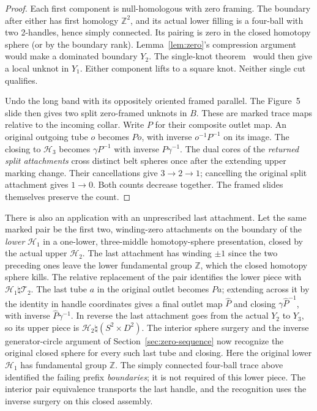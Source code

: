 \documentclass[11pt,letterpaper]{article}
\numberwithin{equation}{section}
\theoremstyle{remark}
\newcommand{\HB}[1]{\mathcal H_{#1}}
\newcommand{\TB}[1]{\mathcal T_{#1}}
\begin{document}
\begin{proof}
Each first component is null-homologous with zero framing. The
boundary after either has first homology \(\mathbb Z^2\), and its
actual lower filling is a four-ball with two 2-handles, hence simply
connected. Its pairing is zero in the closed homotopy sphere (or
by the boundary rank). Lemma~\ref{lem:zero}'s compression argument
would make a dominated boundary \(Y_2\).
The single-knot theorem~\cite[Theorem 5.1]{MeierSchirmerZupan2016Trisections}
would then give a local unknot in \(Y_1\). Either component lifts
to a square knot. Neither single cut qualifies.

Undo the long band with its oppositely oriented framed parallel.
The Figure~5 slide then gives two split zero-framed unknots in \(B\).
These are marked trace maps relative to the incoming collar. Write
\(P\) for their composite outlet map. An original outgoing tube \(o\)
becomes \(Po\), with inverse \(o^{-1}P^{-1}\) on its image. The
closing to \(\HB3\) becomes \(\gamma P^{-1}\) with inverse
\(P\gamma^{-1}\). The dual cores of the \emph{returned split attachments}
cross distinct belt spheres once after the extending upper marking
change. Their cancellations
give \(3\to2\to1\); cancelling the original split attachment gives
\(1\to0\). Both counts decrease together. The framed slides
themselves preserve the count.
\end{proof}

There is also an application with an unprescribed last attachment.
Let the same marked pair be the first two, winding-zero attachments
on the boundary of the \emph{lower} \(\HB1\) in a one-lower,
three-middle homotopy-sphere presentation, closed by the actual
upper \(\HB2\). The last attachment has winding \(\pm1\) since
the two preceding ones leave the lower fundamental group
\(\mathbb Z\), which the closed homotopy sphere kills.
The relative replacement of the pair
identifies the lower piece with
\(\HB1\natural\TB2\). The last tube \(a\) in the original outlet
becomes \(Pa\); extending across it by the identity in handle
coordinates gives a final outlet map \(\widehat P\) and closing
\(\gamma\widehat P^{-1}\), with inverse
\(\widehat P\gamma^{-1}\). In reverse the last attachment goes from
the actual \(Y_2\) to \(Y_3\), so its upper piece is
\(\HB2\natural(S^2\times D^2)\).
The interior sphere surgery and the inverse generator-circle
argument of Section~\ref{sec:zero-sequence} now recognize the
original closed sphere for every such last tube and closing.
Here the original lower \(\HB1\) has fundamental group
\(\mathbb Z\). The simply connected four-ball trace above identified
the failing prefix \emph{boundaries}; it is not required of this
lower piece. The interior pair equivalence transports the last
handle, and the recognition uses the inverse surgery on this
closed assembly.
\end{document}
